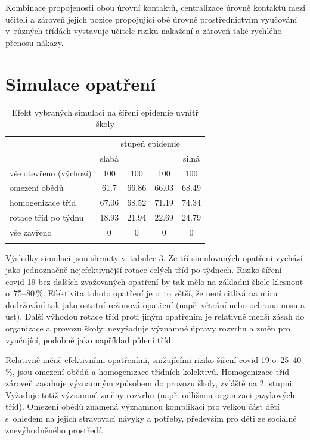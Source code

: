 Kombinace propojenosti obou úrovní kontaktů, centralizace úrovně kontaktů mezi učiteli a zároveň jejich pozice propojující obě úrovně prostřednictvím vyučování v~různých třídách vystavuje učitele riziku nakažení a zároveň také rychlého přenosu nákazy. 

    
\section*{Simulace opatření} 

\begin{table}
    \centering
    \caption{Efekt vybraných simulací na šíření epidemie uvnitř školy}
\begin{tabular}{lcccc}
\hline
                       & \multicolumn{4}{c}{stupeň epidemie} \\ 
                       & slabá   &         &        & silná  \\ \hline
vše otevřeno (výchozí) & 100     & 100     & 100    & 100    \\
omezení obědů          & 61.7    & 66.86   & 66.03  & 68.49  \\
homogenizace tříd      & 67.06   & 68.52   & 71.19  & 74.34  \\
rotace tříd po týdnu   & 18.93   & 21.94   & 22.69  & 24.79  \\
vše zavřeno            & 0       & 0       & 0      & 0      \\ \hline
\label{tab:100-sims}
\end{tabular}
\end{table}

Výsledky simulací jsou shrnuty v~tabulce 3. Ze tří simulovaných opatření vychází jako jednoznačně nejefektivnější rotace celých tříd po týdnech. Riziko šíření covid-19 bez dalších zvažovaných opatření by tak mělo na základní škole klesnout o~75--80\,\%. Efektivita tohoto opatření je o~to větší, že není citlivá na míru dodržování tak jako ostatní režimová opatření (např. větrání nebo ochrana nosu a úst). Další výhodou rotace tříd proti jiným opatřením je relativně menší zásah do organizace a provozu školy: nevyžaduje významné úpravy rozvrhu a změn pro vyučující, podobně jako například půlení tříd.

Relativně méně efektivními opatřeními, snižujícími riziko šíření covid-19 o~25--40\,\%, jsou omezení obědů a homogenizace třídních kolektivů. Homogenizace tříd zároveň zasahuje významným způsobem do provozu školy, zvláště na 2. stupni. Vyžaduje totiž významné změny rozvrhu (např. odlišnou organizaci jazykových tříd). Omezení obědů znamená významnou komplikaci pro velkou část dětí s~ohledem na jejich stravovací návyky a potřeby, především pro děti ze sociálně znevýhodněného prostředí.


